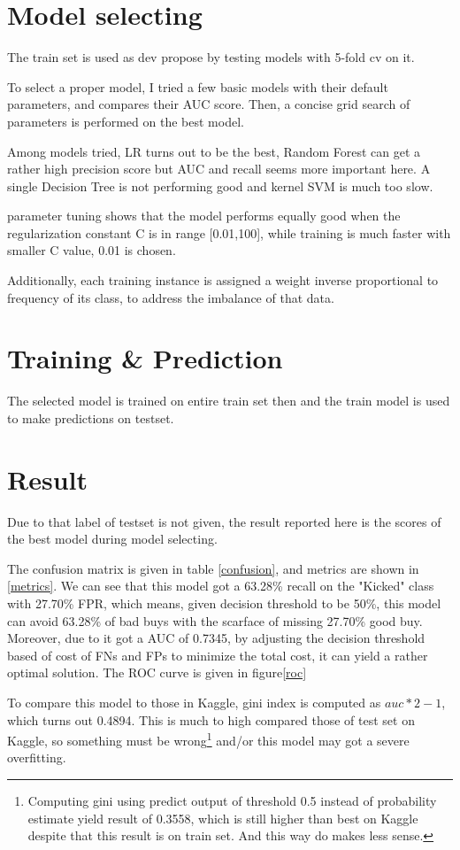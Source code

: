 \documentclass[a4paper]{article}
\begin{document}
\section{Model selecting}
The train set is used as dev propose by testing models with 5-fold cv on it.

To select a proper model, I tried a few basic models with their default parameters, and compares their AUC score. Then, a concise grid search of parameters is performed on the best model.

Among models tried, LR turns out to be the best, Random Forest can get a rather high precision score but AUC and recall seems more important here. A single Decision Tree is not performing good and kernel SVM is much too slow.

parameter tuning shows that the model performs equally good when the regularization constant C is in range [0.01,100], while training is much faster with smaller C value, 0.01 is chosen.

Additionally, each training instance is assigned a weight inverse proportional to frequency of its class, to address the imbalance of that data.

\section{Training \& Prediction}
The selected model is trained on entire train set then and the train model is used to make predictions on testset.

\section{Result}
Due to that label of testset is not given, the result reported here is the scores of the best model during model selecting.

The confusion matrix is given in table \ref{confusion}, and metrics are shown in \ref{metrics}. We can see that this model got a 63.28\% recall on the "Kicked" class with 27.70\% FPR, which means, given decision threshold to be 50\%, this model can avoid 63.28\% of bad buys with the scarface of missing 27.70\% good buy. Moreover, due to it got a AUC of 0.7345, by adjusting the decision threshold based of cost of FNs and FPs to minimize the total cost, it can yield a rather optimal solution. The ROC curve is given in figure\ref{roc}

To compare this model to those in Kaggle, gini index is computed as $auc*2-1$, which turns out 0.4894. This is much to high compared those of test set on Kaggle, so something must be wrong\footnote{Computing gini using predict output of threshold 0.5 instead of probability estimate yield result of 0.3558, which is still higher than best on Kaggle despite that this result is on train set. And this way do makes less sense.} and/or this model may got a severe overfitting.
\end{document}
